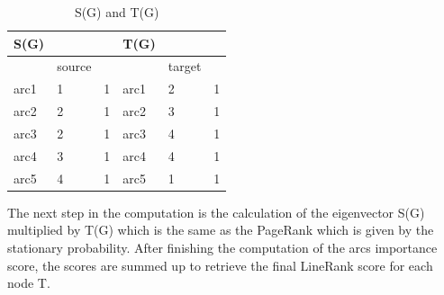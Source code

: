 \begin{table}[t]
	\caption{S(G) and T(G)}
	\label{t1}
	\begin{center}
		\begin{tabular}{|l|l|l|l|l|l|}
			\hline
			S(G)	&	&	&T(G)	&	&	\\ \hline
				&source	&	&	&target	&	\\	\hline
			arc1	&1	&1	&arc1	&2	&1	\\ \hline
			arc2	&2	&1	&arc2	&3	&1	\\ \hline
			arc3	&2	&1	&arc3	&4	&1	\\ \hline
			arc4	&3	&1	&arc4	&4	&1	\\ \hline
			arc5	&4	&1	&arc5	&1	&1	\\ \hline
		\end{tabular}
	\end{center}
\end{table}

The next step in the computation is the calculation of the eigenvector S(G) multiplied by T(G) which is the same as the PageRank which is given by the stationary probability. After finishing the computation of the arcs importance score, the scores are summed up to retrieve the final LineRank score for each node T.
